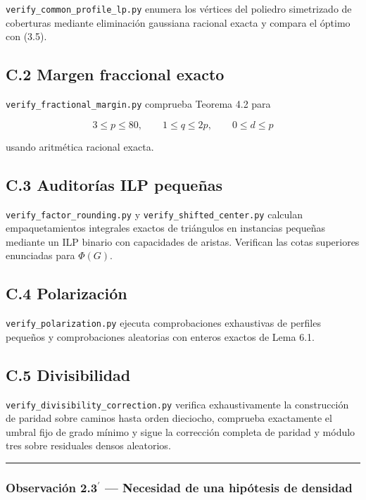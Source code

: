 \documentclass[spanish,11pt,a4paper]{article}
\begin{document}
\nolinkurl{verify_common_profile_lp.py} enumera los vértices del
poliedro simetrizado de coberturas mediante eliminación gaussiana
racional exacta y compara el óptimo con (3.5).

\subsection{C.2 Margen fraccional
exacto}\label{c.2-margen-fraccional-exacto}

\nolinkurl{verify_fractional_margin.py} comprueba Teorema 4.2 para

\[
3\le p\le80,
\qquad
1\le q\le2p,
\qquad
0\le d\le p
\]

usando aritmética racional exacta.

\subsection{C.3 Auditorías ILP
pequeñas}\label{c.3-auditoruxedas-ilp-pequeuxf1as}

\nolinkurl{verify_factor_rounding.py} y
\nolinkurl{verify_shifted_center.py} calculan empaquetamientos integrales
exactos de triángulos en instancias pequeñas mediante un ILP binario con
capacidades de aristas. Verifican las cotas superiores enunciadas para
\(\Phi(G)\).

\subsection{C.4 Polarización}\label{c.4-polarizaciuxf3n}

\nolinkurl{verify_polarization.py} ejecuta comprobaciones exhaustivas de
perfiles pequeños y comprobaciones aleatorias con enteros exactos de
Lema 6.1.

\subsection{C.5 Divisibilidad}\label{c.5-divisibilidad}

\nolinkurl{verify_divisibility_correction.py} verifica exhaustivamente la
construcción de paridad sobre caminos hasta orden dieciocho, comprueba
exactamente el umbral fijo de grado mínimo y sigue la corrección
completa de paridad y módulo tres sobre residuales densos aleatorios.

\begin{center}\rule{0.5\linewidth}{0.5pt}\end{center}

\subsubsection{\texorpdfstring{Observación 2.3\(^{\prime}\) ---
Necesidad de una hipótesis de
densidad}{Observación 2.3\^{}\{\textbackslash prime\} --- Necesidad de una hipótesis de densidad}}\label{observaciuxf3n-2.3prime-necesidad-de-una-hipuxf3tesis-de-densidad}
\end{document}
